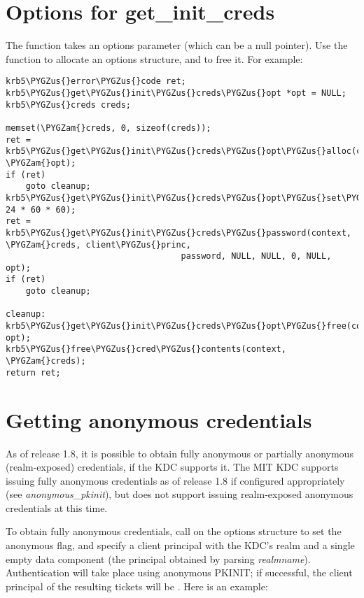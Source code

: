\documentclass[letterpaper,10pt,english]{sphinxmanual}
\def\PYGZus{\char`\_}
\def\PYGZam{\char`\&}
\begin{document}
\section{Options for get\_init\_creds}
\label{appdev/init_creds:options-for-get-init-creds}
The function {\hyperref[appdev/refs/api/krb5_get_init_creds_password:c.krb5_get_init_creds_password]{}} takes an options
parameter (which can be a null pointer).  Use the function
{\hyperref[appdev/refs/api/krb5_get_init_creds_opt_alloc:c.krb5_get_init_creds_opt_alloc]{}} to allocate an options
structure, and {\hyperref[appdev/refs/api/krb5_get_init_creds_opt_free:c.krb5_get_init_creds_opt_free]{}} to free it.  For
example:

\begin{Verbatim}[commandchars=\\\{\}]
krb5\PYGZus{}error\PYGZus{}code ret;
krb5\PYGZus{}get\PYGZus{}init\PYGZus{}creds\PYGZus{}opt *opt = NULL;
krb5\PYGZus{}creds creds;

memset(\PYGZam{}creds, 0, sizeof(creds));
ret = krb5\PYGZus{}get\PYGZus{}init\PYGZus{}creds\PYGZus{}opt\PYGZus{}alloc(context, \PYGZam{}opt);
if (ret)
    goto cleanup;
krb5\PYGZus{}get\PYGZus{}init\PYGZus{}creds\PYGZus{}opt\PYGZus{}set\PYGZus{}tkt\PYGZus{}life(opt, 24 * 60 * 60);
ret = krb5\PYGZus{}get\PYGZus{}init\PYGZus{}creds\PYGZus{}password(context, \PYGZam{}creds, client\PYGZus{}princ,
                                   password, NULL, NULL, 0, NULL, opt);
if (ret)
    goto cleanup;

cleanup:
krb5\PYGZus{}get\PYGZus{}init\PYGZus{}creds\PYGZus{}opt\PYGZus{}free(context, opt);
krb5\PYGZus{}free\PYGZus{}cred\PYGZus{}contents(context, \PYGZam{}creds);
return ret;
\end{Verbatim}


\section{Getting anonymous credentials}
\label{appdev/init_creds:getting-anonymous-credentials}
As of release 1.8, it is possible to obtain fully anonymous or
partially anonymous (realm-exposed) credentials, if the KDC supports
it.  The MIT KDC supports issuing fully anonymous credentials as of
release 1.8 if configured appropriately (see \emph{anonymous\_pkinit}),
but does not support issuing realm-exposed anonymous credentials at
this time.

To obtain fully anonymous credentials, call
{\hyperref[appdev/refs/api/krb5_get_init_creds_opt_set_anonymous:c.krb5_get_init_creds_opt_set_anonymous]{}} on the options
structure to set the anonymous flag, and specify a client principal
with the KDC's realm and a single empty data component (the principal
obtained by parsing \emph{realmname}).  Authentication will take
place using anonymous PKINIT; if successful, the client principal of
the resulting tickets will be
.  Here is an example:
\end{document}
